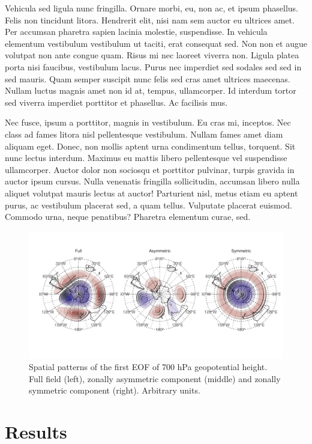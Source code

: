 \documentclass[twocol]{ametsocV5}
\begin{document}
Vehicula sed ligula nunc fringilla. Ornare morbi, eu, non ac, et ipsum
phasellus. Felis non tincidunt litora. Hendrerit elit, nisi nam sem
auctor eu ultrices amet. Per accumsan pharetra sapien lacinia molestie,
suspendisse. In vehicula elementum vestibulum vestibulum ut taciti, erat
consequat sed. Non non et augue volutpat non ante congue quam. Risus mi
nec laoreet viverra non. Ligula platea porta nisi faucibus, vestibulum
lacus. Purus nec imperdiet sed sodales sed sed in sed mauris. Quam
semper suscipit nunc felis sed cras amet ultrices maecenas. Nullam
luctus magnis amet non id at, tempus, ullamcorper. Id interdum tortor
sed viverra imperdiet porttitor et phasellus. Ac facilisis mus.

Nec fusce, ipsum a porttitor, magnis in vestibulum. Eu cras mi,
inceptos. Nec class ad fames litora nisl pellentesque vestibulum. Nullam
fames amet diam aliquam eget. Donec, non mollis aptent urna condimentum
tellus, torquent. Sit nunc lectus interdum. Maximus eu mattis libero
pellentesque vel suspendisse ullamcorper. Auctor dolor non sociosqu et
porttitor pulvinar, turpis gravida in auctor ipsum cursus. Nulla
venenatis fringilla sollicitudin, accumsan libero nulla aliquet volutpat
mauris lectus at auctor! Parturient nisl, metus etiam eu aptent purus,
ac vestibulum placerat sed, a quam tellus. Vulputate placerat euismod.
Commodo urna, neque penatibus? Pharetra elementum curae, sed.

\begin{figure}
\includegraphics{method-1} \caption[Spatial patterns of the first EOF of 700 hPa geopotential height]{Spatial patterns of the first EOF of 700 hPa geopotential height. Full field (left), zonally asymmetric component (middle) and zonally symmetric component (right). Arbitrary units.}\label{fig:method}
\end{figure}

\section{Results}
\end{document}
